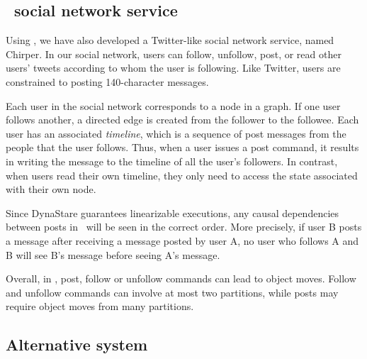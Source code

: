 
\subsection{\dynastarappname\ social network service}
\label{sec:imp:\dynastarappname}

Using \dynastar{}, we have also developed a Twitter-like social network service,
named Chirper. In our social network, users can follow, unfollow, post, or read
other users' tweets according to whom the user is following. Like Twitter, users
are constrained to posting 140-character messages.

Each user in the social network corresponds to a node in a graph. If one user
follows another, a directed edge is created from the follower to the followee.
Each user has an associated \emph{timeline}, which is a sequence of post
messages from the people that the user follows. Thus, when a user issues a post
command, it results in writing the message to the timeline of all the user's
followers.  In contrast, when users read their own timeline, they only need to
access the state associated with their own node.

Since DynaStare guarantees linearizable executions, any causal dependencies
between posts in \dynastarappname\ will be seen in the correct order. More
precisely, if user B posts a message after receiving a message posted by user A,
no user who follows A and B will see B's message before seeing A's message.

Overall, in \dynastarappname, post, follow or unfollow commands can lead to
object moves.  Follow and unfollow commands can involve at most two partitions,
while posts may require object moves from many partitions.



\subsection{Alternative system}

